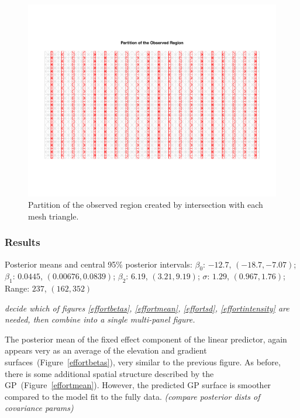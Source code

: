 \documentclass[]{interact}
\begin{document}
\begin{figure}[h]
\includegraphics[width=\textwidth]{figures/bei-effort_partition.pdf}
\caption{Partition of the observed region created by intersection with each
mesh triangle.}
\label{effortpartition}
\end{figure}

\subsubsection{Results}

Posterior means and central 95\% posterior intervals:
\(\beta_{0}\): \(-12.7\), \((-18.7, -7.07)\);
\(\beta_{1}\): \(0.0445\), \((0.00676, 0.0839)\);
\(\beta_{2}\): \(6.19\), \((3.21, 9.19)\);
\(\sigma\): \(1.29\), \((0.967, 1.76)\);
Range: \(237\), \((162, 352)\)

{\it decide which of figures \ref{effortbetas}, \ref{effortmean},
\ref{effortsd}, \ref{effortintensity} are needed, then combine into a single
multi-panel figure.}

The posterior mean of the fixed effect component of the linear predictor,
again appears very as an average of the elevation and gradient
surfaces~(Figure~\ref{effortbetas}), very similar to the previous figure. As
before, there is some additional spatial structure described by the
GP~(Figure~\ref{effortmean}). However, the predicted GP surface is smoother
compared to the model fit to the fully data.
{\it (compare posterior dists of covariance params)}
\end{document}
